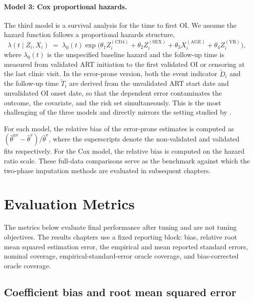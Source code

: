 \paragraph{Model 3: Cox proportional hazards.}
The third model is a survival analysis for the time to first OI. We assume the hazard function follows a proportional hazards structure,
\begin{equation}
    \lambda(t \mid Z_i, X_i) \;=\;
    \lambda_0(t) \exp\!\bigl(
        \theta_1 Z_i^{(\mathrm{CD4})}
      + \theta_2 Z_i^{(\mathrm{SEX})}
      + \theta_3 X_i^{(\mathrm{AGE})}
      + \theta_4 Z_i^{(\mathrm{YR})}
    \bigr),
    \label{eq:vccc_cox}
\end{equation}
where $\lambda_0(t)$ is the unspecified baseline hazard and the follow-up time is measured from validated ART initiation to the first validated OI or censoring at the last clinic visit. In the error-prone version, both the event indicator $\tilde{D}_i$ and the follow-up time $\tilde{T}_i$ are derived from the unvalidated ART start date and unvalidated OI onset date, so that the dependent error contaminates the outcome, the covariate, and the risk set simultaneously. This is the most challenging of the three models and directly mirrors the setting studied by \citet{giganti2020accounting}.

For each model, the relative bias of the error-prone estimates is computed as $(\hat{\theta}^{\mathrm{nv}} - \hat{\theta}^{\mathrm{v}}) / \hat{\theta}^{\mathrm{v}}$, where the superscripts denote the non-validated and validated fits respectively. For the Cox model, the relative bias is computed on the hazard ratio scale. These full-data comparisons serve as the benchmark against which the two-phase imputation methods are evaluated in subsequent chapters.


\section{Evaluation Metrics}
\label{sec:eval_metrics}
The metrics below evaluate final performance after tuning and are not tuning objectives. The results chapters use a fixed reporting block: bias, relative root mean squared estimation error, the empirical and mean reported standard errors, nominal coverage, empirical-standard-error oracle coverage, and bias-corrected oracle coverage.

\subsection{Coefficient bias and root mean squared error}

